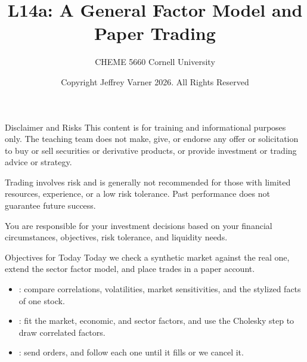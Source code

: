 \documentclass[aspectratio=169,11pt]{beamer}
\title{\texorpdfstring{{\vnheavy L14a}}{L14a}: A General Factor Model and Paper Trading}
\subtitle{CHEME 5660 Cornell University}
\author{Copyright Jeffrey Varner 2026. All Rights Reserved}
\begin{document}
\vntitlepage

\begin{frame}{Disclaimer and Risks}
  \vspace{0.6em}
  \textbf{} This content is for training and informational
  purposes only. The teaching team does not make, give, or endorse any offer or
  solicitation to buy or sell securities or derivative products, or provide
  investment or trading advice or strategy.

  \vspace{1.1em}
  \textbf{} Trading involves risk and is generally not recommended for
  those with limited resources, experience, or a low risk tolerance. Past
  performance does not guarantee future success.

  \vspace{1.1em}
  \textbf{} You are responsible for your investment decisions
  based on your financial circumstances, objectives, risk tolerance, and
  liquidity needs.
\end{frame}

\begin{frame}{Objectives for Today}
  Today we check a synthetic market against the real one, extend the sector factor model, and
  place trades in a paper account.

  \vspace{0.5em}
  {\large\textbf{}}
  \begin{itemize}\setlength{\itemsep}{0.4em}
    \item {}: compare correlations,
      volatilities, market sensitivities, and the stylized facts of one stock.
    \item {}: fit the market, economic,
      and sector factors, and use the Cholesky step to draw correlated factors.
    \item {}: send orders, and follow each one until
      it fills or we cancel it.
  \end{itemize}
\end{frame}
\end{document}

